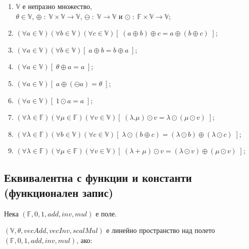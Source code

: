 \documentclass{article}[12pt]
\begin{document}
\begin{enumerate}
\item \(\mathbb{V}\) е непразно множество, \\
\(\theta \in \mathbb{V}\), \(\oplus \; : \; \mathbb{V} \times \mathbb{V} \to \mathbb{V}\), \(\ominus \; : \; \mathbb{V} \to \mathbb{V}\) и \(\odot \; : \; \mathbb{F} \times \mathbb{V} \to \mathbb{V}\);
\item \((\forall a \in \mathbb{V})(\forall b \in \mathbb{V})(\forall c \in \mathbb{V})[\; (a \oplus b) \oplus c = a \oplus (b \oplus c) \;]\);
\item \((\forall a \in \mathbb{V})(\forall b \in \mathbb{V})[\; a \oplus b = b \oplus a \;]\);
\item \((\forall a \in \mathbb{V})[\; \theta \oplus a = a \;]\);
\item \((\forall a \in \mathbb{V})[\; a \oplus (\ominus a) = \theta \;]\);
\item \((\forall a \in \mathbb{V})[\; 1 \odot a = a \;]\);
\item \((\forall \lambda \in \mathbb{F})(\forall \mu \in \mathbb{F})(\forall v \in \mathbb{V})[\; (\lambda . \mu) \odot v = \lambda \odot (\mu \odot v) \;]\);
\item \((\forall \lambda \in \mathbb{F})(\forall b \in \mathbb{V})(\forall c \in \mathbb{V})[\; \lambda \odot (b \oplus c) = (\lambda \odot b) \oplus (\lambda \odot c) \;]\);
\item \((\forall \lambda \in \mathbb{F})(\forall \mu \in \mathbb{F})(\forall v \in \mathbb{V})[\; (\lambda + \mu) \odot v = (\lambda \odot v) \oplus (\mu \odot v) \;]\);
\end{enumerate}

\subsection{Еквивалентна с функции и константи (функционален запис)}

Нека \((\mathbb{F}, 0, 1, add, inv, mul)\) е поле.

\((\mathbb{V}, \theta, vecAdd, vecInv, scalMul)\) е линейно пространство над полето \((\mathbb{F}, 0, 1, add, inv, mul)\), ако:
\end{document}
